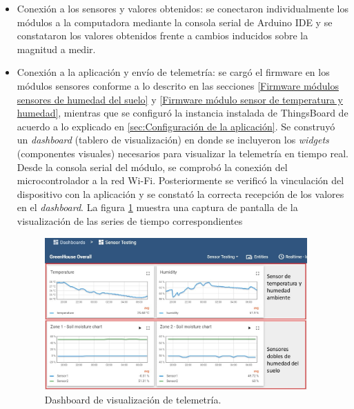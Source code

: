 \begin{itemize}
\item Conexión a los sensores y valores obtenidos: se conectaron individualmente los módulos a la computadora mediante la consola serial de Arduino IDE y se constataron los valores obtenidos frente a cambios inducidos sobre la magnitud a medir.


\item Conexión a la aplicación y envío de telemetría: se cargó el firmware en los módulos sensores conforme a lo descrito en las secciones \ref{Firmware módulos sensores de humedad del suelo} y \ref{Firmware módulo sensor de temperatura y humedad}, mientras que se configuró la instancia instalada de ThingsBoard de acuerdo a lo explicado en \ref{sec:Configuración de la aplicación}. Se construyó un \textit{dashboard} (tablero de visualización) en donde se incluyeron los \textit{widgets} (componentes visuales) necesarios para visualizar la telemetría en tiempo real.
Desde la consola serial del módulo, se comprobó la  conexión del microcontrolador a la red Wi-Fi. Posteriormente se verificó la vinculación del dispositivo con la aplicación y se constató la correcta recepción de los valores en el \textit{dashboard}. La figura \ref{fig:dashboard} muestra una captura de pantalla de la visualización de las series de tiempo correspondientes

\begin{figure}[!h]
	\centering
	\includegraphics[width=0.95\textwidth]{./Figures/chapter4/dashboard.jpg}
	\caption[Dashboard de visualización de telemetría]{Dashboard de visualización de telemetría.}
	\label{fig:dashboard}
\end{figure}





\end{itemize}
